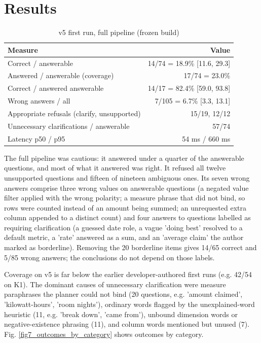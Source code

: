 \documentclass[conference]{IEEEtran}
\begin{document}
\section{Results}
\begin{table}[t]\centering\caption{v5 first run, full pipeline (frozen build)}\footnotesize\begin{tabular}{lr}\toprule Measure & Value \\\midrule Correct / answerable & 14/74 = 18.9\% [11.6, 29.3] \\
Answered / answerable (coverage) & 17/74 = 23.0\% \\
Correct / answered answerable & 14/17 = 82.4\% [59.0, 93.8] \\
Wrong answers / all & 7/105 = 6.7\% [3.3, 13.1] \\
Appropriate refusals (clarify, unsupported) & 15/19, 12/12 \\
Unnecessary clarifications / answerable & 57/74 \\
Latency p50 / p95 & 54 ms / 660 ms \\\bottomrule\end{tabular}\end{table}
The full pipeline was cautious: it answered under a quarter of the answerable questions, and most of what it answered was right. It refused all twelve unsupported questions and fifteen of nineteen ambiguous ones. Its seven wrong answers comprise three wrong values on answerable questions (a negated value filter applied with the wrong polarity; a measure phrase that did not bind, so rows were counted instead of an amount being summed; an unrequested extra column appended to a distinct count) and four answers to questions labelled as requiring clarification (a guessed date role, a vague 'doing best' resolved to a default metric, a 'rate' answered as a sum, and an 'average claim' the author marked as borderline). Removing the 20 borderline items gives 14/65 correct and 5/85 wrong answers; the conclusions do not depend on those labels.

Coverage on v5 is far below the earlier developer-authored first runs (e.g. 42/54 on K1). The dominant causes of unnecessary clarification were measure paraphrases the planner could not bind (20 questions, e.g. 'amount claimed', 'kilowatt-hours', 'room nights'), ordinary words flagged by the unexplained-word heuristic (11, e.g. 'break down', 'came from'), unbound dimension words or negative-existence phrasing (11), and column words mentioned but unused (7). Fig. \ref{fig7_outcomes_by_category} shows outcomes by category.
\end{document}
